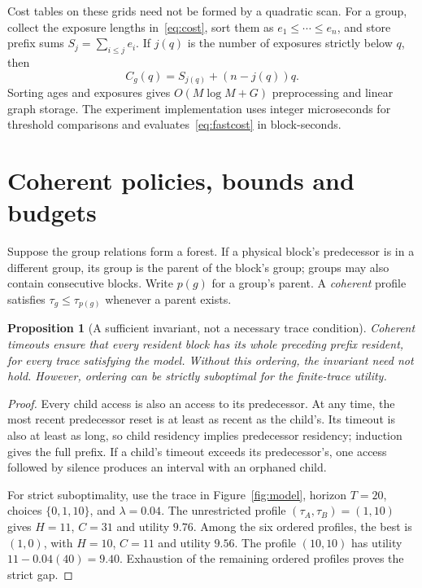 \documentclass[11pt,a4paper]{article}
\newtheorem{proposition}[theorem]{Proposition}
\begin{document}
Cost tables on these grids need not be formed by a quadratic scan. For a group,
collect the exposure lengths in~\eqref{eq:cost}, sort them as
$e_1\leq\cdots\leq e_n$, and store prefix sums $S_j=\sum_{i\leq j}e_i$.
If $j(q)$ is the number of exposures strictly below $q$, then
\begin{equation}
 C_g(q)=S_{j(q)}+(n-j(q))q.\label{eq:fastcost}
\end{equation}
Sorting ages and exposures gives $O(M\log M+G)$ preprocessing and linear graph
storage. The experiment implementation uses integer microseconds for threshold
comparisons and evaluates~\eqref{eq:fastcost} in block-seconds.

\section{Coherent policies, bounds and budgets}\label{sec:bounds}
Suppose the group relations form a forest. If a physical block's predecessor is
in a different group, its group is the parent of the block's group; groups may
also contain consecutive blocks. Write $p(g)$ for a group's parent. A
\emph{coherent} profile satisfies $\tau_g\leq\tau_{p(g)}$ whenever a parent exists.

\begin{proposition}[A sufficient invariant, not a necessary trace condition]
Coherent timeouts ensure that every resident block has its whole preceding
prefix resident, for every trace satisfying the model. Without this ordering,
the invariant need not hold. However, ordering can be strictly suboptimal for
the finite-trace utility.
\end{proposition}
\begin{proof}
Every child access is also an access to its predecessor. At any time, the most
recent predecessor reset is at least as recent as the child's. Its timeout is
also at least as long, so child residency implies predecessor residency;
induction gives the full prefix. If a child's timeout exceeds its predecessor's,
one access followed by silence produces an interval with an orphaned child.

For strict suboptimality, use the trace in Figure~\ref{fig:model}, horizon
$T=20$, choices $\{0,1,10\}$, and $\lambda=0.04$. The unrestricted profile
$(\tau_A,\tau_B)=(1,10)$ gives $H=11$, $C=31$ and utility $9.76$. Among the six
ordered profiles, the best is $(1,0)$, with $H=10$, $C=11$ and utility $9.56$.
The profile $(10,10)$ has utility $11-0.04(40)=9.40$. Exhaustion of the remaining
ordered profiles proves the strict gap.
\end{proof}
\end{document}
